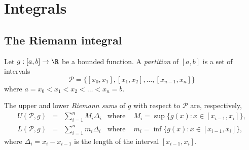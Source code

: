 %
%
%


\section{Integrals}

\subsection{The Riemann integral}
Let $g:[a,b]\to\R$ be a bounded function. A \emph{partition} of $[a,b]$ is a set of intervals
\[
\mathcal{P}=\{ [x_0,x_1], [x_1,x_2], \ldots, [x_{n-1},x_n] \}
\]
where $a = x_0 < x_1 < x_2 < \ldots < x_n = b$.

\bigskip
The upper and lower \emph{Riemann sums} of $g$ with respect to $\mathcal{P}$ are, respectively,
\[
\begin{array}{lclcl}
U(\mathcal{P},g)	& = & \displaystyle\sum_{i=1}^n M_i\Delta_i 	& \text{where } & M_i = \sup\{g(x): x\in [x_{i-1}, x_i]\}, \\
L(\mathcal{P},g) 	& = & \displaystyle\sum_{i=1}^n m_i\Delta_i	& \text{where } & m_i = \inf\{g(x): x\in [x_{i-1}, x_i]\},
\end{array}
\]
where $\Delta_i = x_i- x_{i-1}$ is the length of the interval $[x_{i-1},x_i]$.

